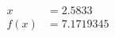 \documentclass[preview]{standalone}
\begin{document}
\begin{align*}
x &= 2.5833\\f(x) &= 7.1719345
\end{align*}
\end{document}
